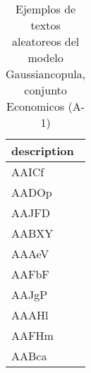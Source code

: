 \begin{table}[H]
\centering
\fontsize{8}{14}\selectfont
\caption{Ejemplos de textos aleatoreos del modelo Gaussiancopula, conjunto Economicos (A-1)}
\label{table-sample10-economicos-a-1-gaussiancopula-text}
\begin{tabular}{|m{50em}|}
\hline
\rowcolor[gray]{0.8}
description \\
\hline AAICf \\
\hline AADOp \\
\hline AAJFD \\
\hline AABXY \\
\hline AAAeV \\
\hline AAFbF \\
\hline AAJgP \\
\hline AAAHl \\
\hline AAFHm \\
\hline AABca \\
\hline
\end{tabular}
\end{table}
